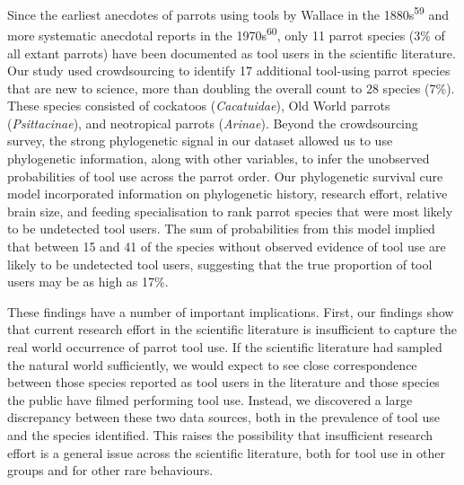 \documentclass[
  man,floatsintext]{apa6}
\begin{document}
Since the earliest anecdotes of parrots using tools by Wallace in the 1880s\textsuperscript{59} and more systematic anecdotal reports in the 1970s\textsuperscript{60},
only 11 parrot species (3\% of all extant parrots) have been documented as tool
users in the scientific literature. Our study used crowdsourcing to identify 17
additional tool-using parrot species that are new to science, more than doubling
the overall count to 28 species (7\%). These species consisted of cockatoos
(\emph{Cacatuidae}), Old World parrots (\emph{Psittacinae}), and neotropical parrots
(\emph{Arinae}). Beyond the crowdsourcing survey, the strong phylogenetic signal in
our dataset allowed us to use phylogenetic information, along with other
variables, to infer the unobserved probabilities of tool use across the parrot
order. Our phylogenetic survival cure model incorporated information on
phylogenetic history, research effort, relative brain size, and feeding
specialisation to rank parrot species that were most likely to be undetected
tool users. The sum of probabilities from this model implied that between 15
and 41 of the species without observed evidence of tool use are likely to be
undetected tool users, suggesting that the true proportion of tool users may be
as high as 17\%.

These findings have a number of important implications. First, our findings show
that current research effort in the scientific literature is insufficient to
capture the real world occurrence of parrot tool use. If the scientific
literature had sampled the natural world sufficiently, we would expect to see
close correspondence between those species reported as tool users in the
literature and those species the public have filmed performing tool use.
Instead, we discovered a large discrepancy between these two data sources, both
in the prevalence of tool use and the species identified. This raises the
possibility that insufficient research effort is a general issue across the
scientific literature, both for tool use in other groups and for other rare
behaviours.
\end{document}
